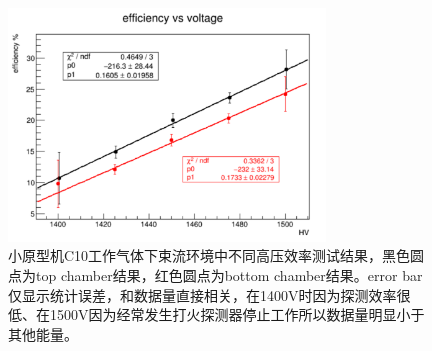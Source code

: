 \begin{figure}[htb]
    \begin{center}
    \includegraphics[width=0.75\textwidth,clip]{figures/Chapter3/BeamHVpng.png}
    \end{center}
    \caption[小原型机C10工作气体下束流环境中不同高压效率测试结果]{小原型机C10工作气体下束流环境中不同高压效率测试结果，黑色圆点为top chamber结果，红色圆点为bottom chamber结果。error bar 仅显示统计误差，和数据量直接相关，在1400V时因为探测效率很低、在1500V因为经常发生打火探测器停止工作所以数据量明显小于其他能量。}
    \label{fig:BeamHV}
\end{figure}